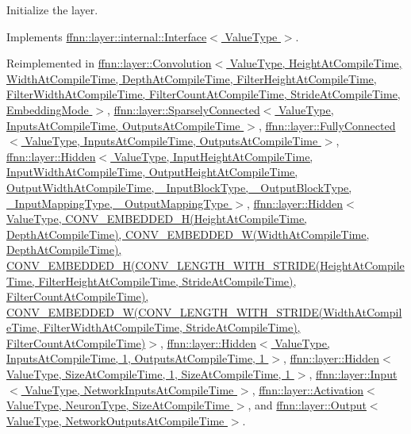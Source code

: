 Initialize the layer. 



Implements \hyperlink{classffnn_1_1layer_1_1internal_1_1_interface_a4159d9d163a0bd5287cc02c91b5baba8}{ffnn\-::layer\-::internal\-::\-Interface$<$ Value\-Type $>$}.



Reimplemented in \hyperlink{classffnn_1_1layer_1_1_convolution_aaeb9c11d69a2d37fbbe4d8d3313953d5}{ffnn\-::layer\-::\-Convolution$<$ Value\-Type, Height\-At\-Compile\-Time, Width\-At\-Compile\-Time, Depth\-At\-Compile\-Time, Filter\-Height\-At\-Compile\-Time, Filter\-Width\-At\-Compile\-Time, Filter\-Count\-At\-Compile\-Time, Stride\-At\-Compile\-Time, Embedding\-Mode $>$}, \hyperlink{classffnn_1_1layer_1_1_sparsely_connected_abb2966b5e7813c43ae2ea5448188a9fb}{ffnn\-::layer\-::\-Sparsely\-Connected$<$ Value\-Type, Inputs\-At\-Compile\-Time, Outputs\-At\-Compile\-Time $>$}, \hyperlink{classffnn_1_1layer_1_1_fully_connected_aec414194202f845b866b0e8b2a51235c}{ffnn\-::layer\-::\-Fully\-Connected$<$ Value\-Type, Inputs\-At\-Compile\-Time, Outputs\-At\-Compile\-Time $>$}, \hyperlink{classffnn_1_1layer_1_1_hidden_a3b5458a771fcf2371376049d85afbc92}{ffnn\-::layer\-::\-Hidden$<$ Value\-Type, Input\-Height\-At\-Compile\-Time, Input\-Width\-At\-Compile\-Time, Output\-Height\-At\-Compile\-Time, Output\-Width\-At\-Compile\-Time, \-\_\-\-Input\-Block\-Type, \-\_\-\-Output\-Block\-Type, \-\_\-\-Input\-Mapping\-Type, \-\_\-\-Output\-Mapping\-Type $>$}, \hyperlink{classffnn_1_1layer_1_1_hidden_a3b5458a771fcf2371376049d85afbc92}{ffnn\-::layer\-::\-Hidden$<$ Value\-Type, C\-O\-N\-V\-\_\-\-E\-M\-B\-E\-D\-D\-E\-D\-\_\-\-H(\-Height\-At\-Compile\-Time, Depth\-At\-Compile\-Time), C\-O\-N\-V\-\_\-\-E\-M\-B\-E\-D\-D\-E\-D\-\_\-\-W(\-Width\-At\-Compile\-Time, Depth\-At\-Compile\-Time), C\-O\-N\-V\-\_\-\-E\-M\-B\-E\-D\-D\-E\-D\-\_\-\-H(\-C\-O\-N\-V\-\_\-\-L\-E\-N\-G\-T\-H\-\_\-\-W\-I\-T\-H\-\_\-\-S\-T\-R\-I\-D\-E(\-Height\-At\-Compile\-Time, Filter\-Height\-At\-Compile\-Time, Stride\-At\-Compile\-Time), Filter\-Count\-At\-Compile\-Time), C\-O\-N\-V\-\_\-\-E\-M\-B\-E\-D\-D\-E\-D\-\_\-\-W(\-C\-O\-N\-V\-\_\-\-L\-E\-N\-G\-T\-H\-\_\-\-W\-I\-T\-H\-\_\-\-S\-T\-R\-I\-D\-E(\-Width\-At\-Compile\-Time, Filter\-Width\-At\-Compile\-Time, Stride\-At\-Compile\-Time), Filter\-Count\-At\-Compile\-Time)$>$}, \hyperlink{classffnn_1_1layer_1_1_hidden_a3b5458a771fcf2371376049d85afbc92}{ffnn\-::layer\-::\-Hidden$<$ Value\-Type, Inputs\-At\-Compile\-Time, 1, Outputs\-At\-Compile\-Time, 1 $>$}, \hyperlink{classffnn_1_1layer_1_1_hidden_a3b5458a771fcf2371376049d85afbc92}{ffnn\-::layer\-::\-Hidden$<$ Value\-Type, Size\-At\-Compile\-Time, 1, Size\-At\-Compile\-Time, 1 $>$}, \hyperlink{classffnn_1_1layer_1_1_input_ac3de713973a8f67dc348a088ab6dbe1c}{ffnn\-::layer\-::\-Input$<$ Value\-Type, Network\-Inputs\-At\-Compile\-Time $>$}, \hyperlink{classffnn_1_1layer_1_1_activation_ae73ef2d36d9c5ce3c219f6a51cba3c35}{ffnn\-::layer\-::\-Activation$<$ Value\-Type, Neuron\-Type, Size\-At\-Compile\-Time $>$}, and \hyperlink{classffnn_1_1layer_1_1_output_ab9ebd05595bc6b75718191aa48e70ad2}{ffnn\-::layer\-::\-Output$<$ Value\-Type, Network\-Outputs\-At\-Compile\-Time $>$}.

